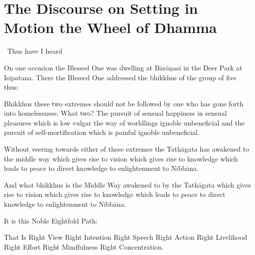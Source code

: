 \section{The Discourse on Setting in Motion the Wheel of Dhamma}
\label{wheel-of-dhamma-full}

\begin{leader-english}
  \anglebracketleft\ \hspace{-0.5mm}Thus have I heard \hspace{-0.5mm}\anglebracketright\
\end{leader-english}

\begin{english-only-hang}
  On one occasion the Blessed One was dwelling at Bārāṇasī in the Deer Park at Isipatana. There the Blessed One addressed the bhikkhus of the group of five thus:
\end{english-only-hang}

\begin{english-only-hang}
  Bhikkhus these two extremes should not be followed by one who has gone forth into homelessness. What two? The pursuit of sensual happiness in sensual pleasures which is low vulgar the way of worldlings ignoble unbeneficial and the pursuit of self-mortification which is painful ignoble unbeneficial.
\end{english-only-hang}

\begin{english-only-hang}
  Without veering towards either of these extremes the Tathāgata has awakened to the middle way which gives rise to vision which gives rise to knowledge which leads to peace to direct knowledge to enlightenment to Nibbāna.
\end{english-only-hang}

\begin{english-only-hang}
  And what bhikkhus is the Middle Way awakened to by the Tathāgata which gives rise to vision which gives rise to knowledge which leads to peace to direct knowledge to enlightenment to Nibbāna.
\end{english-only-hang}

\begin{english-only-hang}
  It is this Noble Eightfold Path:
\end{english-only-hang}

\begin{english-only-hang}
  That Is Right View Right Intention Right Speech Right Action Right Livelihood Right Effort Right Mindfulness Right Concentration.
\end{english-only-hang}

